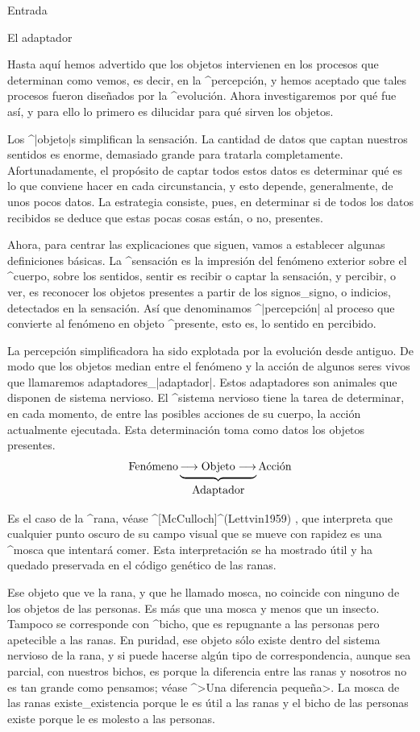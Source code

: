 
\Part Entrada

\Section El adaptador

Hasta aquí hemos advertido que los objetos intervienen en los procesos
que determinan como vemos, es decir, en la ^{percepción}, y hemos
aceptado que tales procesos fueron diseñados por la ^{evolución}. Ahora
investigaremos por qué fue así, y para ello lo primero es dilucidar para
qué sirven los objetos.

Los ^|objeto|s simplifican la sensación. La cantidad de datos que captan
nuestros sentidos es enorme, demasiado grande para tratarla
completamente. Afortunadamente, el propósito de captar todos estos datos
es determinar qué es lo que conviene hacer en cada circunstancia, y esto
depende, generalmente, de unos pocos datos. La estrategia consiste,
pues, en determinar si de todos los datos recibidos se deduce que estas
pocas cosas están, o no, presentes.

Ahora, para centrar las explicaciones que siguen, vamos a establecer
algunas definiciones básicas. La ^{sensación} es la impresión del
fenómeno exterior sobre el ^{cuerpo}, sobre los sentidos, sentir es
recibir o captar la sensación, y percibir, o ver, es reconocer los
objetos presentes a partir de los signos_{signo}, o indicios, detectados
en la sensación. Así que denominamos ^|percepción| al proceso que
convierte al fenómeno en objeto ^{presente}, esto es, lo sentido en
percibido.

La percepción simplificadora ha sido explotada por la evolución desde
antiguo. De modo que los objetos median entre el fenómeno y la acción de
algunos seres vivos que llamaremos adaptadores_|adaptador|. Estos
adaptadores son animales que disponen de sistema nervioso. El ^{sistema
nervioso} tiene la tarea de determinar, en cada momento, de entre las
posibles acciones de su cuerpo, la acción actualmente ejecutada. Esta
determinación toma como datos los objetos presentes.
$$\hbox{Fenómeno}
  \underbrace{
   \longrightarrow
   \hbox{\strut Objeto}
   \longrightarrow}_{\hbox{\strut Adaptador}}
  \hbox{Acción}
$$

Es el caso de la ^{rana}, véase ^[McCulloch]^(Lettvin1959) , que interpreta que cualquier punto oscuro de su campo visual que
se mueve con rapidez es una ^{mosca} que intentará comer. Esta
interpretación se ha mostrado útil y ha quedado preservada en el código
genético de las ranas.

Ese objeto que ve la rana, y que he llamado mosca, no coincide con
ninguno de los objetos de las personas. Es más que una mosca y menos que
un insecto. Tampoco se corresponde con ^{bicho}, que es repugnante a las
personas pero apetecible a las ranas. En puridad, ese objeto sólo existe
dentro del sistema nervioso de la rana, y si puede hacerse algún tipo de
correspondencia, aunque sea parcial, con nuestros bichos, es porque la
diferencia entre las ranas y nosotros no es tan grande como pensamos;
véase ^>Una diferencia pequeña>. La mosca de las ranas
existe_{existencia} porque le es útil a las ranas y el bicho de las
personas existe porque le es molesto a las personas.

